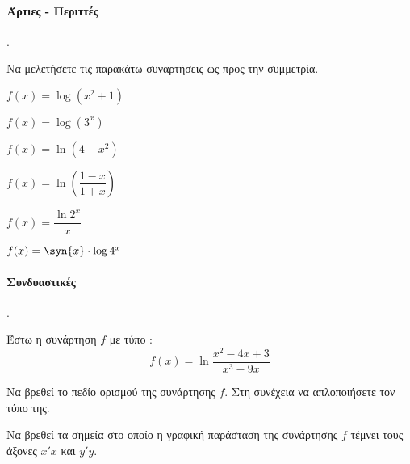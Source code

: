 \documentclass[11pt,a4paper,twocolumn]{article}
\newcounter{askhsh}
\newcommand{\askhsh}{{\large\theaskhsh.}\ \addtocounter{askhsh}{1}}
\begin{document}
\paragraph{Άρτιες - Περιττές}
\askhsh Να μελετήσετε τις παρακάτω συναρτήσεις ως προς την συμμετρία.
\begin{multicols}{2}
\begin{alist}[leftmargin=6mm]
\item $f(x)=\log{\left(x^2+1\right)}$
\item $f(x)=\log{\left(3^x\right)}$
\item $f(x)=\ln{(4-x^2)}$
\item $f(x)=\ln\left(\dfrac{1-x}{1+x}\right)$
\item $f(x)=\dfrac{\ln{2^x}}{x}$
\item $f(x)=\syn{x}\cdot\log{4^x}$
\end{alist}
\end{multicols}
\paragraph{Συνδυαστικές}
\askhsh Έστω η συνάρτηση $ f $ με τύπο :
\[ f(x)=\ln\frac{x^2-4x+3}{x^3-9x} \]
\begin{alist}
\item Να βρεθεί το πεδίο ορισμού της συνάρτησης $ f $. Στη συνέχεια να απλοποιήσετε τον τύπο της.
\item Να βρεθεί τα σημεία στο οποίο η γραφική παράσταση της συνάρτησης $ f $ τέμνει τους άξονες $x'x$ και $ y'y $.
\item 
\end{alist}
\end{document}
